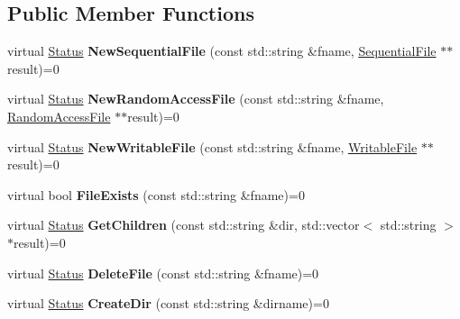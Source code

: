 \subsection*{Public Member Functions}
\begin{DoxyCompactItemize}
\item 
\mbox{\label{classleveldb_1_1_env_ad73810059f48c1d7b91125d357e7d351}} 
virtual \mbox{\hyperlink{classleveldb_1_1_status}{Status}} {\bfseries New\+Sequential\+File} (const std\+::string \&fname, \mbox{\hyperlink{classleveldb_1_1_sequential_file}{Sequential\+File}} $\ast$$\ast$result)=0
\item 
\mbox{\label{classleveldb_1_1_env_a1df3e0bb2d47ee914448df9bb9ca0734}} 
virtual \mbox{\hyperlink{classleveldb_1_1_status}{Status}} {\bfseries New\+Random\+Access\+File} (const std\+::string \&fname, \mbox{\hyperlink{classleveldb_1_1_random_access_file}{Random\+Access\+File}} $\ast$$\ast$result)=0
\item 
\mbox{\label{classleveldb_1_1_env_a4566194f3e82fede425fdb5bb355f7de}} 
virtual \mbox{\hyperlink{classleveldb_1_1_status}{Status}} {\bfseries New\+Writable\+File} (const std\+::string \&fname, \mbox{\hyperlink{classleveldb_1_1_writable_file}{Writable\+File}} $\ast$$\ast$result)=0
\item 
\mbox{\label{classleveldb_1_1_env_acbb85047fdf7bf441bd365cfb09f9ecb}} 
virtual bool {\bfseries File\+Exists} (const std\+::string \&fname)=0
\item 
\mbox{\label{classleveldb_1_1_env_a53028e3112d7bb3bf6574ddaab18d6f6}} 
virtual \mbox{\hyperlink{classleveldb_1_1_status}{Status}} {\bfseries Get\+Children} (const std\+::string \&dir, std\+::vector$<$ std\+::string $>$ $\ast$result)=0
\item 
\mbox{\label{classleveldb_1_1_env_ac956b984466d5f09309664177687f9af}} 
virtual \mbox{\hyperlink{classleveldb_1_1_status}{Status}} {\bfseries Delete\+File} (const std\+::string \&fname)=0
\item 
\mbox{\label{classleveldb_1_1_env_ae6b7c8122df5a8020b2a3439ac39646e}} 
virtual \mbox{\hyperlink{classleveldb_1_1_status}{Status}} {\bfseries Create\+Dir} (const std\+::string \&dirname)=0
$$
\end{DoxyCompactItemize}
